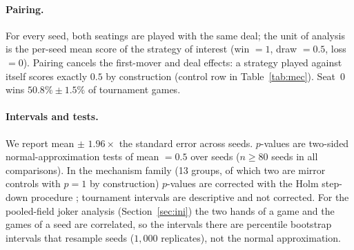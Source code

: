 \documentclass[11pt]{article}
\begin{document}
\paragraph{Pairing.} For every seed, both seatings are played with the same deal; the unit of analysis is the per-seed mean score of the strategy of interest (win $=1$, draw $=0.5$, loss $=0$). Pairing cancels the first-mover and deal effects: a strategy played against itself scores exactly $0.5$ by construction (control row in Table~\ref{tab:mec}). Seat~0 wins $50.8\%\pm1.5\%$ of tournament games.
\paragraph{Intervals and tests.} We report mean $\pm$ $1.96\times$ the standard error across seeds. $p$-values are two-sided normal-approximation tests of mean $=0.5$ over seeds ($n\ge 80$ seeds in all comparisons). In the mechanism family (13 groups, of which two are mirror controls with $p=1$ by construction) $p$-values are corrected with the Holm step-down procedure \cite{holm1979}; tournament intervals are descriptive and not corrected. For the pooled-field joker analysis (Section~\ref{sec:ini}) the two hands of a game and the games of a seed are correlated, so the intervals there are percentile bootstrap intervals that resample seeds ($1{,}000$ replicates), not the normal approximation.
\end{document}
